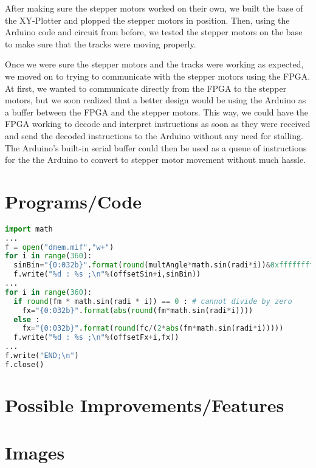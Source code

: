 \documentclass[12pt]{article}
\begin{document}
After making sure the stepper motors worked on their own, we built the base of the XY-Plotter and plopped the stepper motors in position. Then, using the Arduino code and circuit from before, we tested the stepper motors on the base to make sure that the tracks were moving properly.

Once we were sure the stepper motors and the tracks were working as expected, we moved on to trying to communicate with the stepper motors using the FPGA. At first, we wanted to communicate directly from the FPGA to the stepper motors, but we soon realized that a better design would be using the Arduino as a buffer between the FPGA and the stepper motors. This way, we could have the FPGA working to decode and interpret instructions as soon as they were received and send the decoded instructions to the Arduino without any need for stalling. The Arduino's built-in serial buffer could then be used as a queue of instructions for the the Arduino to convert to stepper motor movement without much hassle.
\newpage
\section{Programs/Code}

\begin{lstlisting}[language=python, caption={Python Code for generating Lookup Tables in dmem.mif}, captionpos=b]
import math
... 
f = open("dmem.mif","w+")
for i in range(360):
  sinBin="{0:032b}".format(round(multAngle*math.sin(radi*i))&0xffffffff)
  f.write("%d : %s ;\n"%(offsetSin+i,sinBin))
...
for i in range(360):
  if round(fm * math.sin(radi * i)) == 0 : # cannot divide by zero
    fx="{0:032b}".format(abs(round(fm*math.sin(radi*i))))
  else :
    fx="{0:032b}".format(round(fc/(2*abs(fm*math.sin(radi*i)))))
  f.write("%d : %s ;\n"%(offsetFx+i,fx))
...
f.write("END;\n")
f.close()
\end{lstlisting}


\section{Possible Improvements/Features}

\section{Images}

\end{document}
